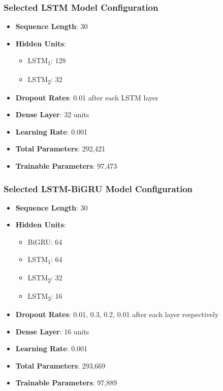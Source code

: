 \subsubsection{Selected LSTM Model Configuration}

\begin{itemize}
  \item \textbf{Sequence Length}: 30
  \item \textbf{Hidden Units}:
    \begin{itemize}
      \item LSTM\textsubscript{1}: 128
      \item LSTM\textsubscript{2}: 32
    \end{itemize}
  \item \textbf{Dropout Rates}: 0.01 after each LSTM layer
  \item \textbf{Dense Layer}: 32 units
  \item \textbf{Learning Rate}: 0.001
  \item \textbf{Total Parameters}: 292,421
  \item \textbf{Trainable Parameters}: 97,473
\end{itemize}

\subsubsection{Selected LSTM-BiGRU Model Configuration}

\begin{itemize}
  \item \textbf{Sequence Length}: 30
  \item \textbf{Hidden Units}:
    \begin{itemize}
      \item BiGRU: 64
      \item LSTM\textsubscript{1}: 64
      \item LSTM\textsubscript{2}: 32
      \item LSTM\textsubscript{3}: 16
    \end{itemize}
  \item \textbf{Dropout Rates}: 0.01, 0.3, 0.2, 0.01 after each layer respectively
  \item \textbf{Dense Layer}: 16 units
  \item \textbf{Learning Rate}: 0.001
  \item \textbf{Total Parameters}: 293,669
  \item \textbf{Trainable Parameters}: 97,889
\end{itemize}

